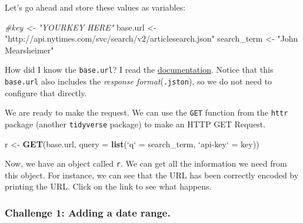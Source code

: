\documentclass[]{book}
\newenvironment{Shaded}{\begin{snugshade}}{\end{snugshade}}
\newcommand{\KeywordTok}[1]{\textcolor[rgb]{0.13,0.29,0.53}{\textbf{#1}}}
\newcommand{\DataTypeTok}[1]{\textcolor[rgb]{0.13,0.29,0.53}{#1}}
\newcommand{\StringTok}[1]{\textcolor[rgb]{0.31,0.60,0.02}{#1}}
\newcommand{\CommentTok}[1]{\textcolor[rgb]{0.56,0.35,0.01}{\textit{#1}}}
\newcommand{\OperatorTok}[1]{\textcolor[rgb]{0.81,0.36,0.00}{\textbf{#1}}}
\newcommand{\NormalTok}[1]{#1}
\begin{document}
Let's go ahead and store these values as variables:

\begin{Shaded}
\begin{Highlighting}[]
\CommentTok{#key <- "YOURKEY HERE"}
\NormalTok{base.url <-}\StringTok{ "http://api.nytimes.com/svc/search/v2/articlesearch.json"}
\NormalTok{search_term <-}\StringTok{ "John Mearsheimer"}
\end{Highlighting}
\end{Shaded}

How did I know the \texttt{base.url}? I read the
\href{https://developer.nytimes.com/docs/articlesearch-product/1/routes/articlesearch.json/get}{documentation}.
Notice that this \texttt{base.url} also includes the \emph{response
format}(\texttt{.jston}), so we do not need to configure that directly.

We are ready to make the request. We can use the \texttt{GET} function
from the \texttt{httr} package (another \texttt{tidyverse} package) to
make an HTTP GET Request.

\begin{Shaded}
\begin{Highlighting}[]
\NormalTok{r <-}\StringTok{ }\KeywordTok{GET}\NormalTok{(base.url, }\DataTypeTok{query =} \KeywordTok{list}\NormalTok{(}\StringTok{`}\DataTypeTok{q}\StringTok{`}\NormalTok{ =}\StringTok{ }\NormalTok{search_term,}
                                \StringTok{`}\DataTypeTok{api-key}\StringTok{`}\NormalTok{ =}\StringTok{ }\NormalTok{key))}
\end{Highlighting}
\end{Shaded}

Now, we have an object called \texttt{r}. We can get all the information
we need from this object. For instance, we can see that the URL has been
correctly encoded by printing the URL. Click on the link to see what
happens.

\begin{Shaded}
\end{Shaded}

\subsubsection*{Challenge 1: Adding a date
range.}\label{challenge-1-adding-a-date-range.}
\end{document}
